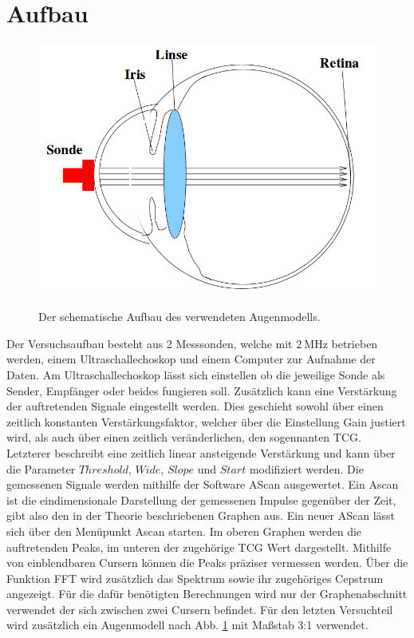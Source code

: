 \section{Aufbau}
\label{sec:Aufbau}

\begin{figure}
 \centering
 \caption{Der schematische Aufbau des verwendeten Augenmodells.\cite{US1}}
 \includegraphics[width=\linewidth-170pt,height=\textheight-170pt,keepaspectratio]{content/AUGE.png}
 \label{fig:auge}
\end{figure}

Der Versuchsaufbau besteht aus 2 Messsonden, welche mit $\SI{2}{\mega\hertz}$
betrieben werden, einem Ultraschallechoskop und einem Computer zur Aufnahme der Daten.
Am Ultraschallechoskop lässt sich einstellen ob die jeweilige Sonde als Sender,
Empfänger oder beides fungieren soll. Zusätzlich kann eine Verstärkung der
auftretenden Signale eingestellt werden. Dies geschieht sowohl über einen zeitlich konstanten Verstärkungsfaktor,
welcher über die Einstellung Gain justiert wird, als auch über einen zeitlich
veränderlichen, den sogennanten  TCG. Letzterer beschreibt eine zeitlich linear ansteigende Verstärkung
und kann über die Parameter $Threshold$, $Wide$, $Slope$ und $Start$
modifiziert werden. Die gemessenen Signale werden mithilfe der
Software AScan ausgewertet. Ein Ascan ist die eindimensionale Darstellung der gemessenen Impulse gegenüber der Zeit, gibt also den in der Theorie beschriebenen Graphen aus.
 Ein neuer AScan lässt sich über den Menüpunkt Ascan starten. Im oberen
Graphen werden die auftretenden Peaks, im unteren der zugehörige TCG Wert
dargestellt. Mithilfe von einblendbaren Cursern können die Peaks präziser vermessen
werden. Über die Funktion FFT wird zusätzlich das Spektrum sowie ihr zugehöriges
Cepstrum angezeigt. Für die dafür benötigten Berechnungen wird nur der
Graphenabschnitt verwendet der sich zwischen zwei Cursern befindet.
Für den letzten Versuchteil wird zusätzlich ein Augenmodell nach Abb. \ref{fig:auge} mit Maßstab 3:1 verwendet.
